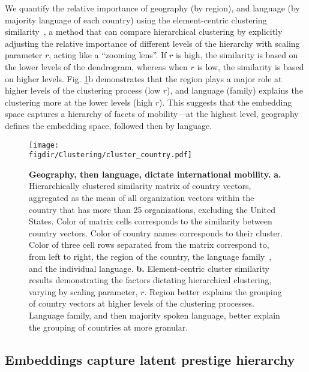 \documentclass[12pt]{article} %
\def\figdir{../Figs}
\begin{document}
We quantify the relative importance of geography (by region), and language (by majority language of each country) using the element-centric clustering similarity~\autocite{gates2019element}, a method that can compare hierarchical clustering by explicitly adjusting the relative importance of different levels of the hierarchy with scaling parameter $r$, acting like a ``zooming lens''.
If $r$ is high, the similarity is based on the lower levels of the dendrogram, whereas when $r$ is low, the similarity is based on higher levels.
Fig. \ref{fig:clustering}b demonstrates that the region plays a major role at higher levels of the clustering process (low $r$), and language (family) explains the clustering more at the lower levels (high $r$).
This suggests that the embedding space captures a hierarchy of facets of mobility---at the highest level, geography defines the  embedding space, followed then by language.


%
%
\begin{figure}[p!]
	\centering
	\texttt{[image: \\figdir/Clustering/cluster\_country.pdf]}
	\caption{
		\textbf{Geography, then language, dictate international mobility.}
		\textbf{a.} Hierarchically clustered similarity matrix of country vectors, aggregated as the mean of all organization vectors within the country that has more than 25 organizations, excluding the United States.
		Color of matrix cells corresponds to the similarity between country vectors.
		Color of country names corresponds to their cluster.
		Color of three cell rows separated from the matrix correspond to, from left to right, the region of the country, the language family~\autocite{ethnologue}, and the individual language.
		\textbf{b.}	Element-centric cluster similarity~\autocite{gates2019element} results demonstrating the factors dictating hierarchical clustering, varying by scaling parameter, $r$.
		Region better explains the grouping of country vectors at higher levels of the clustering processes.
		Language family, and then majority spoken language, better explain the grouping of countries at more granular.
	}
	\label{fig:clustering}
\end{figure}



%
%
\subsection*{Embeddings capture latent prestige hierarchy}
\end{document}
